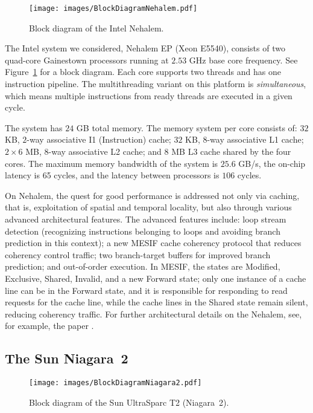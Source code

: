 \documentclass{article}
\begin{document}
\begin{figure}
\centering
\texttt{[image: images/BlockDiagramNehalem.pdf]}
\caption{Block diagram of the Intel Nehalem.}
\label{fig:nehalem}
\end{figure}

The Intel system we considered, Nehalem EP (Xeon E5540), consists of two quad-core Gainestown processors 
running at $2.53$ GHz base core frequency. See Figure~\ref{fig:nehalem} for a block diagram.
Each core supports two threads and has one instruction pipeline.
The multithreading variant on this platform is {\em simultaneous}, 
which means multiple instructions from ready threads are executed in a given cycle. 

The system has $24$ GB total memory. 
The memory system per core  consists of:
$32$ KB, $2$-way associative I1 (Instruction) cache; 
$32$ KB, $8$-way associative L1 cache;
$2 \times 6$ MB, $8$-way associative L2 cache; and
$8$ MB L3 cache shared by the four cores.
The maximum memory bandwidth of the system is $25.6$ GB/s, 
the on-chip latency is 65 cycles, and the latency between processors is $106$ cycles. 

On Nehalem, the quest for good performance is addressed not only via caching,
that is, exploitation of  spatial and temporal locality, but also through various 
advanced architectural  features. The advanced features include: loop stream detection 
(recognizing instructions belonging to loops and avoiding branch prediction in this context);   
a new MESIF cache coherency protocol that reduces coherency control traffic; 
two branch-target buffers for improved branch prediction;  and out-of-order execution. 
In MESIF, the states are Modified, Exclusive, Shared, Invalid, and a  new Forward state;  
only one instance of a cache line can be in the Forward state, and it is responsible for 
responding to read requests for the cache line, while the  cache lines  in the 
Shared state  remain silent, reducing coherency traffic.
For further architectural details on the Nehalem, see, for example, the paper \cite{Nehalem1}. 

\subsection{The Sun Niagara~2}
\label{sec:niagara}

\begin{figure}
\centering
\texttt{[image: images/BlockDiagramNiagara2.pdf]}
\caption{Block diagram of the Sun UltraSparc T2 (Niagara~2).} 
\label{fig:niagara}
\end{figure}
\end{document}
